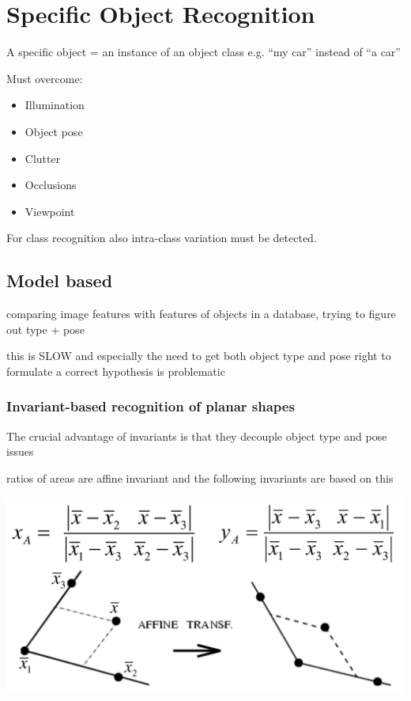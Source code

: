 \section{Specific Object Recognition}

A specific object = an instance of an object class e.g. “my car” instead of “a car”

Must overcome:
\begin{itemize}
	\item Illumination
	\item Object pose
	\item Clutter
	\item Occlusions
	\item Viewpoint
\end{itemize}

For class recognition also intra-class variation must be detected.

\subsection{Model based}
comparing image features with features of objects in a database, trying to figure out type + pose

this is SLOW and especially the need to get both object type and pose
right to formulate a correct hypothesis is problematic

\subsubsection{Invariant-based recognition of planar shapes}
The crucial advantage of invariants is that they decouple object type and pose issues

ratios of areas
are affine invariant and the following invariants are based on this

\includegraphics[width=\columnwidth]{pictures/affine}

